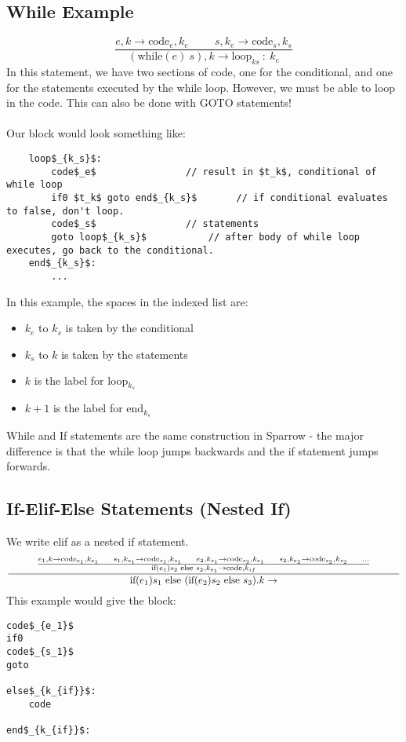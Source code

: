 \documentclass[10pt]{article}
\begin{document}
\subsection*{While Example}
\[\frac{e, k \rightarrow \text{code}_e, k_e \hspace{1cm} s, k_e \rightarrow \text{code}_s, k_s}{(\text{while}(e)\: s), k \rightarrow \text{loop}_{ks} \::\: k_e}\]
In this statement, we have two sections of code, one for the conditional, and one for the statements executed by the while loop.  However, we must be able to loop in the code.  This can also be done with GOTO statements!\\\\
Our block would look something like:
\begin{lstlisting}
    loop$_{k_s}$:
        code$_e$                // result in $t_k$, conditional of while loop
        if0 $t_k$ goto end$_{k_s}$       // if conditional evaluates to false, don't loop.
        code$_s$                // statements
        goto loop$_{k_s}$           // after body of while loop executes, go back to the conditional.
    end$_{k_s}$:
        ...
\end{lstlisting}
In this example, the spaces in the indexed list are:
\begin{itemize}
    \item $k_e$ to $k_s$ is taken by the conditional
    \item $k_s$ to $k$ is taken by the statements
    \item $k$ is the label for loop$_{k_s}$
    \item $k + 1$ is the label for end$_{k_s}$
\end{itemize}
While and If statements are the same construction in Sparrow - the major difference is that the while loop jumps backwards and the if statement jumps forwards.

\subsection*{If-Elif-Else Statements (Nested If)}
We write elif as a nested if statement.
\[\frac{\hspace{1cm}\frac{e_1, k \rightarrow \text{code}_{e_1}, k_{e_1} \hspace{0.5cm} s_1, k_{e_1} \rightarrow \text{code}_{s_1}, k_{s_1} \hspace{0.5cm} e_2, k_{s_1} \rightarrow \text{code}_{s_2}, k_{e_1} \hspace{0.5cm} s_2, k_{e_2} \rightarrow \text{code}_{s_2}, k_{s_2} \hspace{0.5cm}\dots}{\text{if}(e_1) s_2 \text{ else } s_2, k_{e_1} \rightarrow \text{code}, k_{if}}\hspace{1cm}}{\text{if}(e_1) s_1 \text{ else } (\text{if} (e_2) s_2 \text{ else } s_3). k \rightarrow }\]
This example would give the block:
\begin{lstlisting}
code$_{e_1}$
if0
code$_{s_1}$
goto

else$_{k_{if}}$:
    code

end$_{k_{if}}$:



\end{lstlisting}
\end{document}
